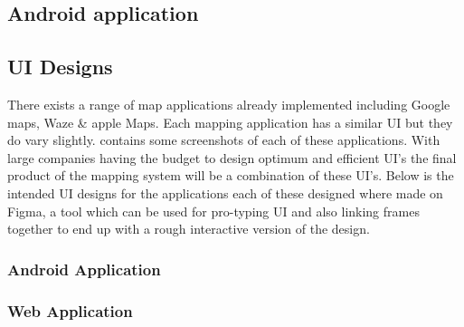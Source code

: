 \subsection{Android application}

\subsection{UI Designs}
There exists a range of map applications already implemented including Google maps, Waze \& apple Maps. Each mapping application has a similar UI but they do vary slightly. \appendixtemp contains some screenshots of each of these applications. With large companies having the budget to design optimum and efficient UI's the final product of the mapping system will be a combination of these UI's. Below is the intended UI designs for the applications each of these designed where made on Figma, a tool which can be used for pro-typing UI and also linking frames together to end up with a rough interactive version of the design.

\subsubsection{Android Application}


\subsubsection{Web Application}
